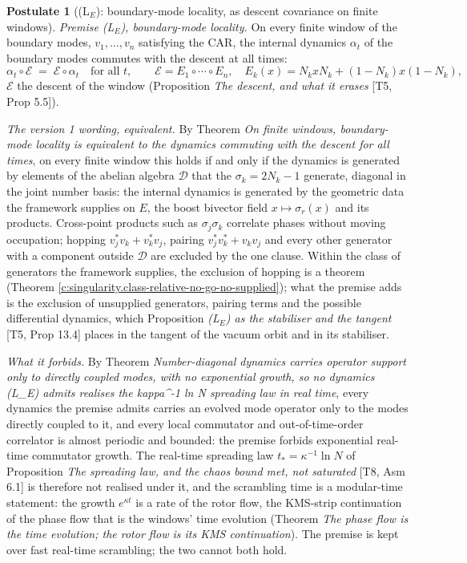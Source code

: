 \documentclass[11pt]{article}
\theoremstyle{definition}
\newtheorem{postulate}[theorem]{Postulate}
\theoremstyle{plain}
\begin{document}
\begin{postulate}[(L$_E$): boundary-mode locality, as descent covariance on finite windows]\label{c:singularity.l-boundary-mode-locality}
\emph{Premise (L$_{E}$), boundary-mode locality.} On every finite window of the boundary modes, $v_{1}, \dots, v_{n}$ satisfying the CAR, the internal dynamics $\alpha_{t}$ of the boundary modes commutes with the descent at all times:
\[
\alpha_{t}\circ\mathcal{E} \;=\; \mathcal{E}\circ\alpha_{t} \quad \text{for all } t, \qquad \mathcal{E} = E_{1}\circ\cdots\circ E_{n}, \quad E_{k}(x) = N_{k}xN_{k} + (1 - N_{k})x(1 - N_{k}),
\]
$\mathcal{E}$ the descent of the window (Proposition \emph{The descent, and what it erases} [T5, Prop 5.5]).

\emph{The version 1 wording, equivalent.} By Theorem \emph{On finite windows, boundary-mode locality is equivalent to the dynamics commuting with the descent for all times}, on every finite window this holds if and only if the dynamics is generated by elements of the abelian algebra $\mathcal{D}$ that the $\sigma_{k} = 2N_{k} - 1$ generate, diagonal in the joint number basis: the internal dynamics is generated by the geometric data the framework supplies on $E$, the boost bivector field $x \mapsto \sigma_{r}(x)$ and its products. Cross-point products such as $\sigma_{j}\sigma_{k}$ correlate phases without moving occupation; hopping $v_{j}^{*}v_{k} + v_{k}^{*}v_{j}$, pairing $v_{j}^{*}v_{k}^{*} + v_{k}v_{j}$ and every other generator with a component outside $\mathcal{D}$ are excluded by the one clause. Within the class of generators the framework supplies, the exclusion of hopping is a theorem (Theorem \ref{c:singularity.class-relative-no-go-no-supplied}); what the premise adds is the exclusion of unsupplied generators, pairing terms and the possible differential dynamics, which Proposition \emph{(L$_E$) as the stabiliser and the tangent} [T5, Prop 13.4] places in the tangent of the vacuum orbit and in its stabiliser.

\emph{What it forbids.} By Theorem \emph{Number-diagonal dynamics carries operator support only to directly coupled modes, with no exponential growth, so no dynamics (L\_E) admits realises the kappa\^{}{-1} ln N spreading law in real time}, every dynamics the premise admits carries an evolved mode operator only to the modes directly coupled to it, and every local commutator and out-of-time-order correlator is almost periodic and bounded: the premise forbids exponential real-time commutator growth. The real-time spreading law $t_{*} = \kappa^{-1}\ln N$ of Proposition \emph{The spreading law, and the chaos bound met, not saturated} [T8, Asm 6.1] is therefore not realised under it, and the scrambling time is a modular-time statement: the growth $e^{\kappa t}$ is a rate of the rotor flow, the KMS-strip continuation of the phase flow that is the windows' time evolution (Theorem \emph{The phase flow is the time evolution; the rotor flow is its KMS continuation}). The premise is kept over fast real-time scrambling; the two cannot both hold.
\end{postulate}
\end{document}
